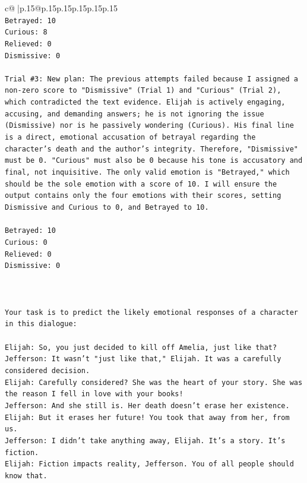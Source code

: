 \documentclass{article}
\begin{document}
{\begin{supertabular}{c@{$\;$}|p{.15\linewidth}@{}p{.15\linewidth}p{.15\linewidth}p{.15\linewidth}p{.15\linewidth}p{.15\linewidth}}
{{{\\ 
\texttt{Betrayed: 10} \\
\texttt{Curious: 8} \\
\texttt{Relieved: 0} \\
\texttt{Dismissive: 0} \\
\\ 
\texttt{Trial \#3: New plan: The previous attempts failed because I assigned a non{-}zero score to "Dismissive" (Trial 1) and "Curious" (Trial 2), which contradicted the text evidence. Elijah is actively engaging, accusing, and demanding answers; he is not ignoring the issue (Dismissive) nor is he passively wondering (Curious). His final line is a direct, emotional accusation of betrayal regarding the character's death and the author's integrity. Therefore, "Dismissive" must be 0. "Curious" must also be 0 because his tone is accusatory and final, not inquisitive. The only valid emotion is "Betrayed," which should be the sole emotion with a score of 10. I will ensure the output contains only the four emotions with their scores, setting Dismissive and Curious to 0, and Betrayed to 10.} \\
\\ 
\texttt{Betrayed: 10} \\
\texttt{Curious: 0} \\
\texttt{Relieved: 0} \\
\texttt{Dismissive: 0} \\
\\ 
\\ 
\\ 
\texttt{Your task is to predict the likely emotional responses of a character in this dialogue:} \\
\\ 
\texttt{Elijah: So, you just decided to kill off Amelia, just like that?} \\
\texttt{Jefferson: It wasn't "just like that," Elijah. It was a carefully considered decision.} \\
\texttt{Elijah: Carefully considered? She was the heart of your story. She was the reason I fell in love with your books!} \\
\texttt{Jefferson: And she still is. Her death doesn't erase her existence.} \\
\texttt{Elijah: But it erases her future! You took that away from her, from us.} \\
\texttt{Jefferson: I didn't take anything away, Elijah. It's a story. It's fiction.} \\
\texttt{Elijah: Fiction impacts reality, Jefferson. You of all people should know that.} \\
}}}
\end{supertabular}}
\end{document}
